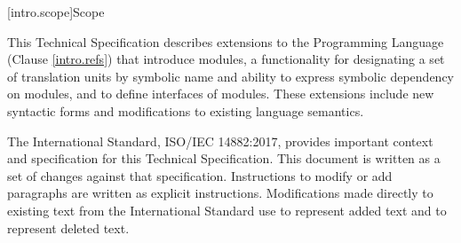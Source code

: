 
[intro.scope]{Scope}

\pnum
This Technical Specification describes extensions to the \Cpp
Programming Language (Clause \ref{intro.refs}) that introduce modules,
a functionality for designating a set of translation units by symbolic
name and ability to express symbolic dependency on modules, and to
define interfaces of modules.  These extensions include 
new syntactic forms and modifications to existing language semantics.

\pnum
The International Standard, ISO/IEC 14882:2017, provides important context
and specification for this Technical Specification. This document is 
written as a set of changes against that specification. Instructions
to modify or add paragraphs are written as explicit instructions. 
Modifications made directly to existing text from the International
Standard use  to represent added text and
 to represent deleted text.

